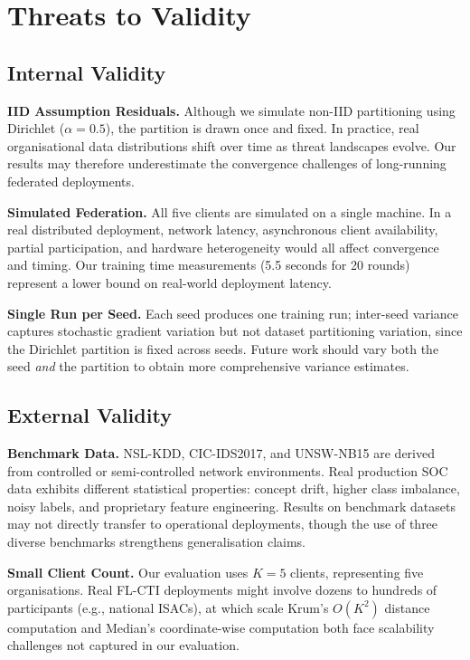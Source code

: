 \documentclass[conference]{IEEEtran}
\begin{document}
\section{Threats to Validity}

\subsection{Internal Validity}

\textbf{IID Assumption Residuals.}
Although we simulate non-IID partitioning using Dirichlet
($\alpha=0.5$), the partition is drawn once and fixed.
In practice, real organisational data distributions shift over time
as threat landscapes evolve.
Our results may therefore underestimate the convergence challenges of
long-running federated deployments.

\textbf{Simulated Federation.}
All five clients are simulated on a single machine.
In a real distributed deployment, network latency, asynchronous client
availability, partial participation, and hardware heterogeneity would
all affect convergence and timing.
Our training time measurements (5.5 seconds for 20 rounds) represent a
lower bound on real-world deployment latency.

\textbf{Single Run per Seed.}
Each seed produces one training run; inter-seed variance captures
stochastic gradient variation but not dataset partitioning variation,
since the Dirichlet partition is fixed across seeds.
Future work should vary both the seed \emph{and} the partition to
obtain more comprehensive variance estimates.

\subsection{External Validity}

\textbf{Benchmark Data.}
NSL-KDD, CIC-IDS2017, and UNSW-NB15 are derived from controlled or
semi-controlled network environments.
Real production SOC data exhibits different statistical properties:
concept drift, higher class imbalance, noisy labels, and proprietary
feature engineering.
Results on benchmark datasets may not directly transfer to operational
deployments, though the use of three diverse benchmarks strengthens
generalisation claims.

\textbf{Small Client Count.}
Our evaluation uses $K=5$ clients, representing five organisations.
Real FL-CTI deployments might involve dozens to hundreds of
participants (e.g., national ISACs), at which scale Krum's
$O(K^2)$ distance computation and Median's coordinate-wise
computation both face scalability challenges not captured in our
evaluation.
\end{document}
